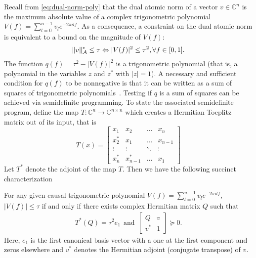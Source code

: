 Recall from \eqref{eq:dual-norm-poly} that the dual atomic norm of a vector $v
\in \mathbb{C}^n$ is the maximum absolute value of a complex trigonometric
polynomial $V(f) = \sum_{l=0}^{n-1} v_l e^{-2\pi i l f}$. As a
consequence, a constraint on the dual atomic norm is equivalent to
a bound on the magnitude of $V(f)$:
\begin{align*}
\|v\|_{\mathcal{A}}^* \leq \tau \Leftrightarrow |V(f)|^2 \leq \tau^2, \forall f \in [0, 1].
\end{align*}
The function $q(f) = \tau^2-|V(f)|^2$ is a trigonometric polynomial (that is, a
polynomial in the variables $z$ and $z^*$ with $|z|=1$). A necessary and
sufficient condition for $q(f)$ to be nonnegative is that it can be written as
a sum of squares of trigonometric polynomials~\cite{Megretski03}. 
Testing if $q$ is a sum of squares can be achieved
via semidefinite programming. To state the associated semidefinite program,
define the map $T:\mathbb{C}^n \rightarrow \mathbb{C}^{n\times n}$ which
creates a Hermitian Toeplitz matrix out of its input, that is
\[
T(x)= \left[
\begin{array}{ccccc} x_1 & x_2 & \ldots & x_n\\ 
x^*_2 & x_1  & \ldots & x_{n-1}\\
 \vdots & \vdots & \ddots & \vdots\\
 x^*_n & x^*_{n-1}  & \ldots & x_1
 \end{array}\right]
\]
Let $T^*$ denote the adjoint of the map $T$. Then we have the following
succinct characterization

\begin{lemma}\cite[Theorem 4.24]{brl2007}\label{lm:brl} For any given causal trigonometric polynomial $V(f) = \sum_{l=0}^{n-1} v_l
e^{-2\pi i l f}$, $|V(f)| \leq \tau $ if and only if there exists complex
Hermitian matrix $Q$ such that
\begin{align*}
T^*(Q) = \tau^2 {e}_1~~\mbox{and}~~
\begin{bmatrix}
  Q & v \\
  v^* & 1
 \end{bmatrix} \succeq 0.
\end{align*}
Here, ${e}_1$ is the first canonical basis vector with a one at the first
component and zeros elsewhere and $v^*$ denotes the Hermitian adjoint
(conjugate transpose) of $v$.
\end{lemma}


